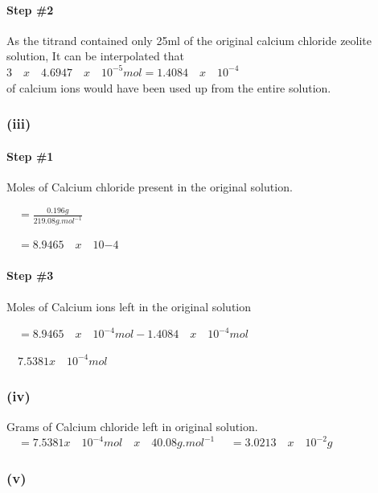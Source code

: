 \documentclass[]{article}
\let\oldparagraph\paragraph
\renewcommand{\paragraph}[1]{\oldparagraph{#1}\mbox{}}
\begin{document}
\hypertarget{step-2-4}{%
\paragraph{Step \#2}\label{step-2-4}}

As the titrand contained only 25ml of the original calcium chloride
zeolite solution, It can be interpolated that
\(3 \quad x\quad 4.6947 \quad x \quad 10^{-5}mol= 1.4084 \quad x \quad 10^{-4}\)\\
of calcium ions would have been used up from the entire solution.

\hypertarget{iii}{%
\subsubsection{(iii)}\label{iii}}

\hypertarget{step-1-5}{%
\paragraph{Step \#1}\label{step-1-5}}

Moles of Calcium chloride present in the original solution.

\(\quad = \frac{0.196g}{219.08g.mol^{-1}}\)

\(\quad = 8.9465 \quad x \quad 10{-4}\)

\hypertarget{step-3-4}{%
\paragraph{Step \#3}\label{step-3-4}}

Moles of Calcium ions left in the original solution

\(\quad = 8.9465 \quad x \quad 10^{-4}mol - 1.4084 \quad x \quad 10^{-4}mol\)

\(\quad 7.5381 x \quad 10^{-4}mol\)

\hypertarget{iv}{%
\subsubsection{(iv)}\label{iv}}

Grams of Calcium chloride left in original solution.
\(\quad = 7.5381 x \quad 10^{-4}mol \quad x \quad 40.08g.mol^{-1}\)
\(\quad = 3.0213 \quad x \quad 10^{-2}g\)

\hypertarget{v}{%
\subsubsection{(v)}\label{v}}
\end{document}
